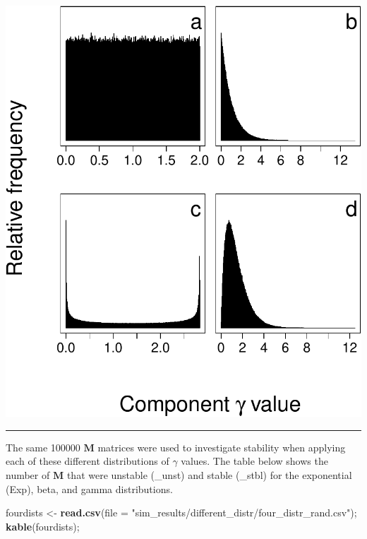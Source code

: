 \documentclass[]{article}
\newenvironment{Shaded}{\begin{snugshade}}{\end{snugshade}}
\newcommand{\KeywordTok}[1]{\textcolor[rgb]{0.13,0.29,0.53}{\textbf{{#1}}}}
\newcommand{\DataTypeTok}[1]{\textcolor[rgb]{0.13,0.29,0.53}{{#1}}}
\newcommand{\StringTok}[1]{\textcolor[rgb]{0.31,0.60,0.02}{{#1}}}
\newcommand{\NormalTok}[1]{{#1}}
\begin{document}
\includegraphics{SI_files/figure-latex/unnamed-chunk-23-1.pdf}

\begin{center}\rule{0.5\linewidth}{\linethickness}\end{center}

The same 100000 \(\mathbf{M}\) matrices were used to investigate
stability when applying each of these different distributions of
\(\gamma\) values. The table below shows the number of \(\mathbf{M}\)
that were unstable (\_unst) and stable (\_stbl) for the exponential
(Exp), beta, and gamma distributions.

\begin{Shaded}
\begin{Highlighting}[]
\NormalTok{fourdists <-}\StringTok{ }\KeywordTok{read.csv}\NormalTok{(}\DataTypeTok{file =} \StringTok{"sim_results/different_distr/four_distr_rand.csv"}\NormalTok{);}
\KeywordTok{kable}\NormalTok{(fourdists);}
\end{Highlighting}
\end{Shaded}
\end{document}
